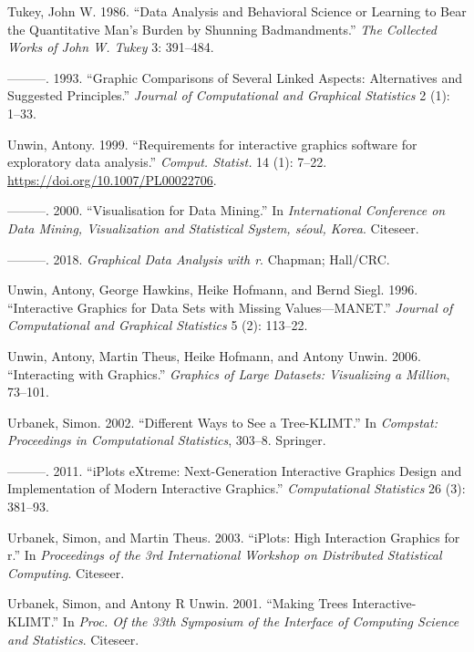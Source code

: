 \documentclass[
]{book}
\newlength{\cslhangindent}
\newenvironment{CSLReferences}[2] %
 {\begin{list}{}{%
  \setlength{\itemindent}{0pt}
  \setlength{\leftmargin}{0pt}
  \setlength{\parsep}{0pt}
  \ifodd #1
   \setlength{\leftmargin}{\cslhangindent}
   \setlength{\itemindent}{-1\cslhangindent}
  \fi
  \setlength{\itemsep}{#2\baselineskip}}}
 {\end{list}}
\begin{document}
\begin{CSLReferences}{1}{0}
Tukey, John W. 1986. {``Data Analysis and Behavioral Science or Learning to Bear the Quantitative Man's Burden by Shunning Badmandments.''} \emph{The Collected Works of John W. Tukey} 3: 391--484.

---------. 1993. {``Graphic Comparisons of Several Linked Aspects: Alternatives and Suggested Principles.''} \emph{Journal of Computational and Graphical Statistics} 2 (1): 1--33.

Unwin, Antony. 1999. {``{Requirements for interactive graphics software for exploratory data analysis}.''} \emph{Comput. Statist.} 14 (1): 7--22. \url{https://doi.org/10.1007/PL00022706}.

---------. 2000. {``Visualisation for Data Mining.''} In \emph{International Conference on Data Mining, Visualization and Statistical System, s{é}oul, Korea}. Citeseer.

---------. 2018. \emph{Graphical Data Analysis with r}. Chapman; Hall/CRC.

Unwin, Antony, George Hawkins, Heike Hofmann, and Bernd Siegl. 1996. {``Interactive Graphics for Data Sets with Missing Values---MANET.''} \emph{Journal of Computational and Graphical Statistics} 5 (2): 113--22.

Unwin, Antony, Martin Theus, Heike Hofmann, and Antony Unwin. 2006. {``Interacting with Graphics.''} \emph{Graphics of Large Datasets: Visualizing a Million}, 73--101.

Urbanek, Simon. 2002. {``Different Ways to See a Tree-KLIMT.''} In \emph{Compstat: Proceedings in Computational Statistics}, 303--8. Springer.

---------. 2011. {``iPlots eXtreme: Next-Generation Interactive Graphics Design and Implementation of Modern Interactive Graphics.''} \emph{Computational Statistics} 26 (3): 381--93.

Urbanek, Simon, and Martin Theus. 2003. {``iPlots: High Interaction Graphics for r.''} In \emph{Proceedings of the 3rd International Workshop on Distributed Statistical Computing}. Citeseer.

Urbanek, Simon, and Antony R Unwin. 2001. {``Making Trees Interactive-KLIMT.''} In \emph{Proc. Of the 33th Symposium of the Interface of Computing Science and Statistics}. Citeseer.


\end{CSLReferences}
\end{document}
